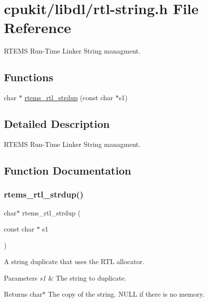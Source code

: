 \hypertarget{rtl-string_8h}{}\section{cpukit/libdl/rtl-\/string.h File Reference}
\label{rtl-string_8h}


R\+T\+E\+MS Run-\/\+Time Linker String managment.  


\subsection*{Functions}
\begin{DoxyCompactItemize}
\item 
char $\ast$ \mbox{\hyperlink{rtl-string_8h_aaea62293930444541e3c8cd91978c9e5}{rtems\+\_\+rtl\+\_\+strdup}} (const char $\ast$s1)
\end{DoxyCompactItemize}


\subsection{Detailed Description}
R\+T\+E\+MS Run-\/\+Time Linker String managment. 



\subsection{Function Documentation}
\mbox{\label{rtl-string_8h_aaea62293930444541e3c8cd91978c9e5}} 
\subsubsection{\texorpdfstring{rtems\_rtl\_strdup()}{rtems\_rtl\_strdup()}}
{\footnotesize\ttfamily char$\ast$ rtems\+\_\+rtl\+\_\+strdup (\begin{DoxyParamCaption}\item[{const char $\ast$}]{s1 }\end{DoxyParamCaption})}

A string duplicate that uses the R\+TL allocator.


\begin{DoxyParams}{Parameters}
{\em s1} & The string to duplicate. \\
\hline
\end{DoxyParams}
\begin{DoxyReturn}{Returns}
char$\ast$ The copy of the string. N\+U\+LL if there is no memory. 
\end{DoxyReturn}
